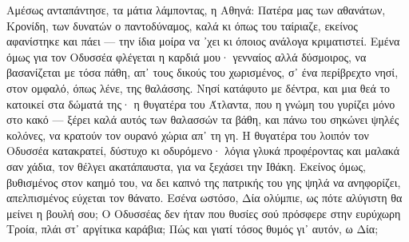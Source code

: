 {    Αμέσως ανταπάντησε, τα μάτια λάμποντας, η Αθηνά: Πατέρα μας των αθανάτων, Κρονίδη, των δυνατών ο παντοδύναμος, καλά κι όπως του ταίριαζε, εκείνος αφανίστηκε και πάει — την ίδια μοίρα να ᾽χει κι όποιος ανάλογα κριματιστεί. Εμένα όμως για τον Οδυσσέα φλέγεται η καρδιά μου· γενναίος αλλά δύσμοιρος, να βασανίζεται με τόσα πάθη, απ᾽ τους δικούς του χωρισμένος, σ᾽ ένα περίβρεχτο νησί, στον ομφαλό, όπως λένε, της θαλάσσης. Νησί κατάφυτο με δέντρα, και μια θεά το κατοικεί στα δώματά της· η θυγατέρα του Άτλαντα, που η γνώμη του γυρίζει μόνο στο κακό — ξέρει καλά αυτός των θαλασσών τα βάθη, και πάνω του σηκώνει ψηλές κολόνες, να κρατούν τον ουρανό χώρια απ᾽ τη γη. Η θυγατέρα του λοιπόν τον Οδυσσέα κατακρατεί, δύστυχο κι οδυρόμενο· λόγια γλυκά προφέροντας και μαλακά σαν χάδια, τον θέλγει ακατάπαυστα, για να ξεχάσει την Ιθάκη. Εκείνος όμως, βυθισμένος στον καημό του, να δει καπνό της πατρικής του γης ψηλά να ανηφορίζει, απελπισμένος εύχεται τον θάνατο. Εσένα ωστόσο, Δία ολύμπιε, ως πότε αλύγιστη θα μείνει η βουλή σου; Ο Οδυσσέας δεν ήταν που θυσίες σού πρόσφερε στην ευρύχωρη Τροία, πλάι στ᾽ αργίτικα καράβια; Πώς και γιατί τόσος θυμός γι᾽ αυτόν, ω Δία;



}
